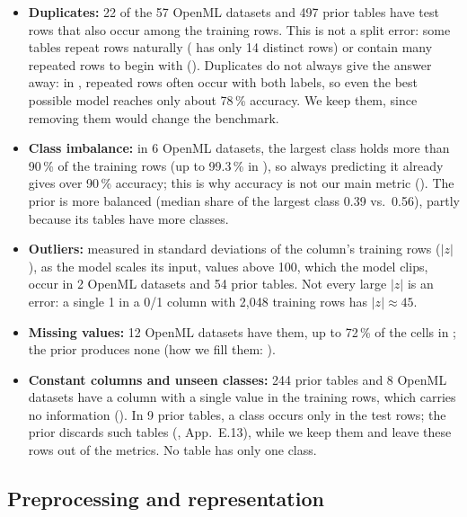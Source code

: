 \begin{itemize}
  \item \textbf{Duplicates:} 22 of the 57 OpenML datasets and 497 prior
    tables have test rows that also occur among the training rows. This is
    not a split error: some tables repeat rows naturally (
    has only 14 distinct rows) or contain many repeated rows to begin with
    (). Duplicates do not always give the answer away: in
    , repeated rows often occur with both labels, so even
    the best possible model reaches only about 78\,\% accuracy. We keep them, since removing them
    would change the benchmark.
  \item \textbf{Class imbalance:} in 6 OpenML datasets, the largest class
    holds more than 90\,\% of the training rows (up to 99.3\,\% in
    ), so always predicting it already gives over 90\,\%
    accuracy; this is why accuracy is not our main metric
    (). The prior is more balanced (median share of the
    largest class 0.39 vs.\ 0.56), partly because its tables have more
    classes.
  \item \textbf{Outliers:} measured in standard deviations of the column's
    training rows ($|z|$), as the model scales its input, values above 100,
    which the model clips, occur in 2 OpenML datasets and 54 prior tables.
    Not every large $|z|$ is an error: a single 1 in a 0/1 column with
    2,048 training rows has $|z| \approx 45$.
  \item \textbf{Missing values:} 12 OpenML datasets have them, up to
    72\,\% of the cells in ; the prior produces none (how we
    fill them: ).
  \item \textbf{Constant columns and unseen classes:} 244 prior tables and
    8 OpenML datasets have a column with a single value in the training
    rows, which carries no information (). In 9 prior
    tables, a class occurs only in the test rows; the \tabicl{} prior
    discards such tables (\citealt{qu2026tabiclv2}, App.~E.13), while we
    keep them and leave these rows out of the metrics. No table has only one
    class.
\end{itemize}


\FloatBarrier
\subsection{Preprocessing and representation}\label{sec:preprocessing}


